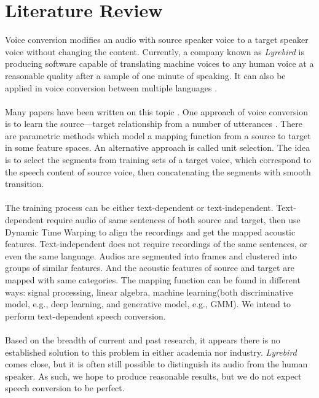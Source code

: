 \documentclass[11pt]{article}
\begin{document}
\section{Literature Review}
Voice conversion modifies an audio with source speaker voice to a target speaker voice without changing the content. Currently, a company known as \textit{Lyrebird} \cite{lyrebird} is producing software capable of translating machine voices to any human voice at a reasonable quality after a sample of one minute of speaking. It can also be applied in voice conversion between multiple languages \cite{anumanchipalli2012intent}.\\
\\
Many papers have been written on this topic \cite{stylianou2009voice}\cite{mohammadi2017verview}. One approach of voice conversion is to learn the source---target relationship from a number of utterances \cite{stylianou2009voice}. There are parametric methods \cite{kawahara1997speech} which model a mapping function from a source to target in some feature spaces. An alternative approach is called unit selection\cite{duxans2006voice}\cite{jin2016cute}. The idea is to select the segments from training sets of a target voice, which correspond to the speech content of source voice, then concatenating the segments with smooth transition. \\
\\
The training process can be either text-dependent or text-independent\cite{duxans2006voice}. Text-dependent require audio of same sentences of both source and target, then use Dynamic Time Warping to align the recordings and get the mapped acoustic features. Text-independent does not require recordings of the same sentences, or even the same language. Audios are segmented into frames and clustered into groups of similar features. And the acoustic features of source and target are mapped with same categories. The mapping function can be found in different ways: signal processing, linear algebra, machine learning(both discriminative model, e.g., deep learning,  and generative model, e.g., GMM)\cite{machado2010voice}. We intend to perform text-dependent speech conversion.\\
\\
Based on the breadth of current and past research, it appears there is no established solution to this problem in either academia nor industry. \textit{Lyrebird} comes close, but it is often still possible to distinguish its audio from the human speaker. As such, we hope to produce reasonable results, but we do not expect speech conversion to be perfect.
\end{document}
